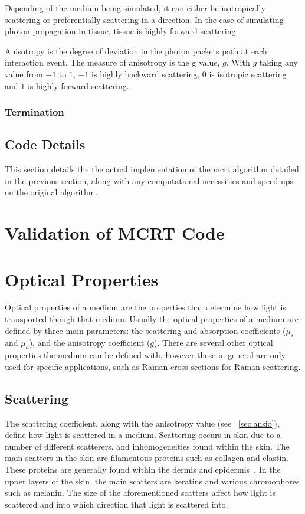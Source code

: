 Depending of the medium being simulated, it can either be isotropically scattering or preferentially scattering in a direction. In the case of simulating photon propagation in tissue, tissue is highly forward scattering.

Anisotropy is the degree of deviation in the photon packets path at each interaction event. The measure of anisotropy is the g value, $g$. With $g$ taking any value from $-1$ to $1$, $-1$ is highly backward scattering, $0$ is isotropic scattering and $1$ is highly forward scattering. 


\subsubsection{Termination}\label{sec:terminator}

\subsection{Code Details}

This section details the the actual implementation of the \gls{mcrt} algorithm detailed in the previous section, along with any computational necessities and speed ups on the original algorithm.

\section{Validation of MCRT Code}
\section{Optical Properties}\label{sec:optprop}

Optical properties of a medium are the properties that determine how light is transported though that medium. Usually the optical properties of a medium are defined by three main parameters: the scattering and absorption coefficients ($\mu_s$ and $\mu_a$), and the anisotropy coefficient ($g$). There are several other optical properties the medium can be defined with, however these in general are only used for specific applications, such as Raman cross-sections for Raman scattering.

\subsection{Scattering}\label{sec:scatt}

The scattering coefficient, along with the anisotropy value (see ~\cref{sec:ansio}), define how light is scattered in a medium. Scattering occurs in skin due to a number of different scatterers, and inhomogeneities found within the skin. The main scatters in the skin are filamentous proteins such as collagen and elastin. These proteins are generally found within the dermis and epidermis~\cite{jacques1996origins}. In the upper layers of the skin, the main scatters are keratins and various chromophores such as melanin. 
The size of the aforementioned scatters affect how light is scattered and into which direction that light is scattered into.

